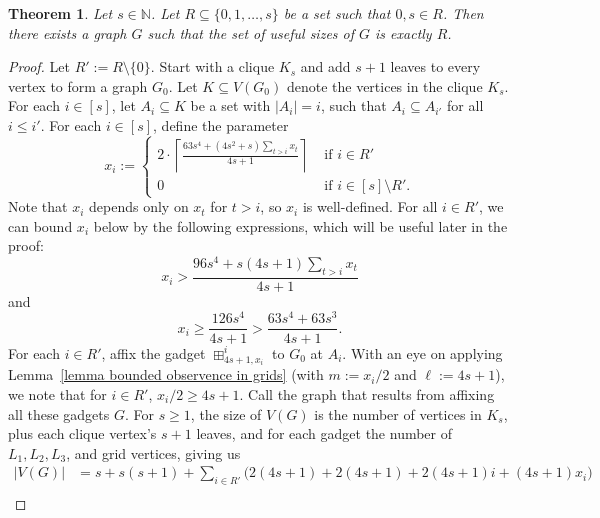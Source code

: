 \documentclass{article}
\newtheorem{theorem}{Theorem}[section]
\begin{document}
        \begin{theorem}\label{theorem every set realizable}
            Let $s\in \mathbb{N}$.
            Let $R\subseteq \{0,1,\dots,s\}$ be a set such that $0,s\in R$.
            Then there exists a graph $G$ such that the set of useful sizes of $G$ is exactly $R$.
        \end{theorem}
        \begin{proof}
            Let $R':=R\setminus \{0\}$.
            Start with a clique $K_s$ and add $s+1$ leaves to every vertex to form a graph $G_0$.
            Let $K\subseteq V(G_0)$ denote the vertices in the clique $K_s$.
            For each $i\in [s]$, let $A_i\subseteq K$ be a set with $|A_i|=i$, such that $A_i\subseteq A_{i'}$ for all $i\leq i'$.
            For each $i\in [s]$, define the parameter
            \[
                x_i:=\begin{cases}
                    2\cdot\left\lceil\displaystyle\frac{63s^4+(4s^2+s) \displaystyle\sum_{t > i}x_{t}}{4s+1}\right\rceil&\text{ if }i\in R'\\
                    0&\text{ if }i\in [s]\setminus R'.
                \end{cases}
            \] 
            Note that $x_i$ depends only on $x_{t}$ for $t > i$, so $x_i$ is well-defined.
            For all $i\in R'$, we can bound $x_i$ below by the following  expressions, which will be useful later in the proof:
            \begin{equation}\label{equation bound on x_i 1}
                x_i>\frac{96s^4+s(4s+1)\displaystyle\sum_{t>i}x_{t}}{4s+1}
            \end{equation} 
            and
            \begin{equation}\label{equation bound on x_i 2}
                x_i\geq \frac{126s^4}{4s+1}>\frac{63s^4+63s^3}{4s+1}.
            \end{equation} 
            For each $i\in R'$, affix the gadget $\boxplus_{4s+1,x_i}^{i}$ to $G_0$ at $A_i$.
            With an eye on applying Lemma~\ref{lemma bounded observence in grids} (with $m:=x_i/2$ and $\ell:=4s+1$), we note that for $i\in R'$, $x_i/2\geq 4s+1$.
            Call the graph that results from affixing all these gadgets $G$.
            For $s \geq 1$, the size of $V(G)$ is the number of vertices in $K_s$, plus each clique vertex's $s+1$ leaves, and for each gadget the number of $L_1, L_2, L_3$, and grid vertices, giving us
            \begin{align}
                |V(G)|&=s+s(s+1)+\sum_{i\in R'} \Big(2(4s+1) + 2(4s+1) + 2(4s+1)i + (4s+1)x_i\Big)\nonumber\\

\end{align}
\end{proof}
\end{document}

